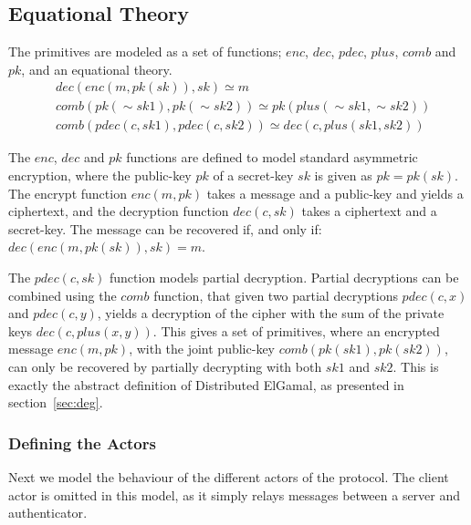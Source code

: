\subsection{Equational Theory}
The primitives are modeled as a set of functions; $enc$, $dec$, $pdec$, $plus$, $comb$ and $pk$, and an equational theory.
\begin{align*}
    &dec\left(enc\left(m,pk\left(sk\right)\right),sk\right) \simeq m\\
    &comb\left(pk\left({\sim}sk1\right),pk\left({\sim}sk2\right)\right) \simeq pk\left(plus\left({\sim}sk1, {\sim}sk2\right)\right)\\
    &comb\left(pdec\left(c,sk1\right), pdec\left(c,sk2\right)\right) \simeq dec\left(c, plus\left(sk1,sk2\right)\right) 
\end{align*}

The $enc$, $dec$ and $pk$ functions are defined to model standard asymmetric encryption, where the public-key $pk$ of a secret-key $sk$ is given as $pk = pk(sk)$. The encrypt function $enc(m,pk)$ takes a message and a public-key and yields a ciphertext, and the decryption function $dec(c,sk)$ takes a ciphertext and a secret-key. The message can be recovered if, and only if: $dec(enc(m,pk(sk)), sk) = m$.

The $pdec(c,sk)$ function models partial decryption. Partial decryptions can be combined using the $comb$ function, that given two partial decryptions $pdec(c,x)$ and $pdec(c,y)$, yields a decryption of the cipher with the sum of the private keys $dec(c,plus(x,y))$. This gives a set of primitives, where an encrypted message $enc(m,pk)$, with the joint public-key $comb(pk(sk1), pk(sk2))$, can only be recovered by partially decrypting with both $sk1$ and $sk2$. This is exactly the abstract definition of Distributed ElGamal, as presented in section~\ref{sec:deg}.

\subsubsection{Defining the Actors}
Next we model the behaviour of the different actors of the protocol. The client actor is omitted in this model, as it simply relays messages between a \gls{server} and \gls{authenticator}.

